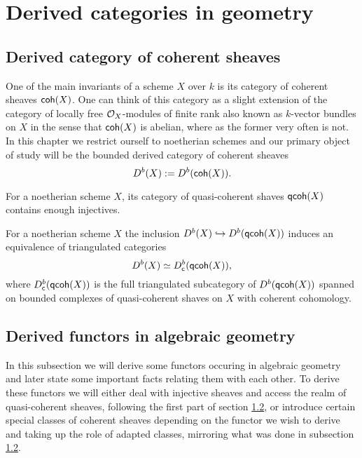\section{Derived categories in geometry}

\subsection{Derived category of coherent sheaves}

One of the main invariants of a scheme $X$ over $k$ is its category of coherent sheaves $\mathsf{coh}(X)$. One can think of this category as a slight extension of the category of locally free $\mathcal O_X$-modules of finite rank also known as $k$-vector bundles on $X$ in the sense that $\mathsf{coh}(X)$ is abelian, where as the former very often is not. In this chapter we restrict ourself to noetherian schemes and our primary object of study will be the bounded derived category of coherent sheaves
\[
    D^b(X) := D^b(\mathsf{coh}(X)).
\]

\begin{proposition}
    For a noetherian scheme $X$, its category of quasi-coherent shaves $\mathsf{qcoh}(X)$ contains enough injectives.
\end{proposition}

\begin{proposition}
    For a noetherian scheme $X$ the inclusion $D^b(X) \hookrightarrow D^b(\mathsf{qcoh}(X))$ induces an equivalence of triangulated categories
    \[
        D^b(X) \simeq D^b_{\mathsf{c}}(\mathsf{qcoh}(X)),
    \]
    where $D^b_{\mathsf{c}}(\mathsf{qcoh}(X))$ is the full triangulated subcategory of $D^b(\mathsf{qcoh}(X))$ spanned on bounded complexes of quasi-coherent shaves on $X$ with coherent cohomology.
\end{proposition}

\begin{proposition}
    
\end{proposition}

\newpage

\subsection{Derived functors in algebraic geometry}

In this subsection we will derive some functors occuring in algebraic geometry and later state some important facts relating them with each other. To derive these functors we will either deal with injective sheaves and access the realm of quasi-coherent sheaves, following the first part of section \ref{}, or introduce certain special classes of coherent sheaves depending on the functor we wish to derive and taking up the role of adapted classes, mirroring what was done in subsection \ref{}.

